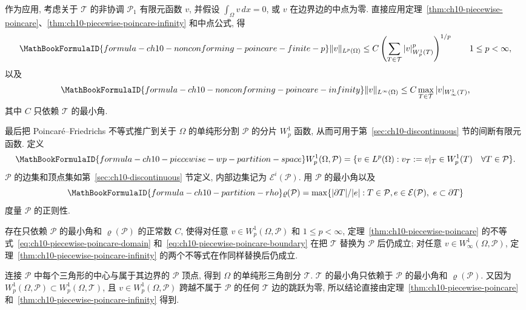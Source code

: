 作为应用, 考虑关于 $\mathcal T$ 的非协调 $\mathcal P_1$ 有限元函数 $v$, 并假设 $\int_\Omega v\,dx=0$, 或 $v$ 在边界边的中点为零. 直接应用定理~\ref{thm:ch10-piecewise-poincare}、\ref{thm:ch10-piecewise-poincare-infinity} 和中点公式, 得
\[
\MathBookFormulaID{formula-ch10-nonconforming-poincare-finite-p}
\|v\|_{L^p(\Omega)}\leq C\left(\sum_{T\in\mathcal T}|v|_{W_p^1(T)}^p\right)^{1/p}
\qquad1\leq p<\infty,
\]
以及
\[
\MathBookFormulaID{formula-ch10-nonconforming-poincare-infinity}
\|v\|_{L^\infty(\Omega)}\leq C\max_{T\in\mathcal T}|v|_{W_\infty^1(T)},
\]
其中 $C$ 只依赖 $\mathcal T$ 的最小角.

最后把 Poincaré--Friedrichs 不等式推广到关于 $\Omega$ 的单纯形分割 $\mathcal P$ 的分片 $W_p^1$ 函数, 从而可用于第~\ref{sec:ch10-discontinuous} 节的间断有限元函数. 定义
\[
\MathBookFormulaID{formula-ch10-piecewise-wp-partition-space}
W_p^1(\Omega,\mathcal P)=\{v\in L^p(\Omega):v_T:=v|_T\in W_p^1(T)
\quad\forall T\in\mathcal P\}.
\]
$\mathcal P$ 的边集和顶点集如第~\ref{sec:ch10-discontinuous} 节定义, 内部边集记为 $\mathcal E^i(\mathcal P)$. 用 $\mathcal P$ 的最小角以及
\[
\MathBookFormulaID{formula-ch10-partition-rho}
\varrho(\mathcal P)=\max\{|\partial T|/|e|:T\in\mathcal P,
e\in\mathcal E(\mathcal P),\ e\subset\partial T\}
\]
度量 $\mathcal P$ 的正则性.

\begin{Theorem}
\label{thm:ch10-piecewise-poincare-partitions}
存在只依赖 $\mathcal P$ 的最小角和 $\varrho(\mathcal P)$ 的正常数 $C$, 使得对任意 $v\in W_p^1(\Omega,\mathcal P)$ 和 $1\leq p<\infty$, 定理~\ref{thm:ch10-piecewise-poincare} 的不等式~\eqref{eq:ch10-piecewise-poincare-domain} 和~\eqref{eq:ch10-piecewise-poincare-boundary} 在把 $\mathcal T$ 替换为 $\mathcal P$ 后仍成立; 对任意 $v\in W_\infty^1(\Omega,\mathcal P)$, 定理~\ref{thm:ch10-piecewise-poincare-infinity} 的两个不等式在作同样替换后仍成立.
\end{Theorem}

\begin{Proof}
连接 $\mathcal P$ 中每个三角形的中心与属于其边界的 $\mathcal P$ 顶点, 得到 $\Omega$ 的单纯形三角剖分 $\mathcal T$. $\mathcal T$ 的最小角只依赖于 $\mathcal P$ 的最小角和 $\varrho(\mathcal P)$. 又因为 $W_p^1(\Omega,\mathcal P)\subset W_p^1(\Omega,\mathcal T)$, 且 $v\in W_p^1(\Omega,\mathcal P)$ 跨越不属于 $\mathcal P$ 的任何 $\mathcal T$ 边的跳跃为零, 所以结论直接由定理~\ref{thm:ch10-piecewise-poincare} 和~\ref{thm:ch10-piecewise-poincare-infinity} 得到.
\end{Proof}

